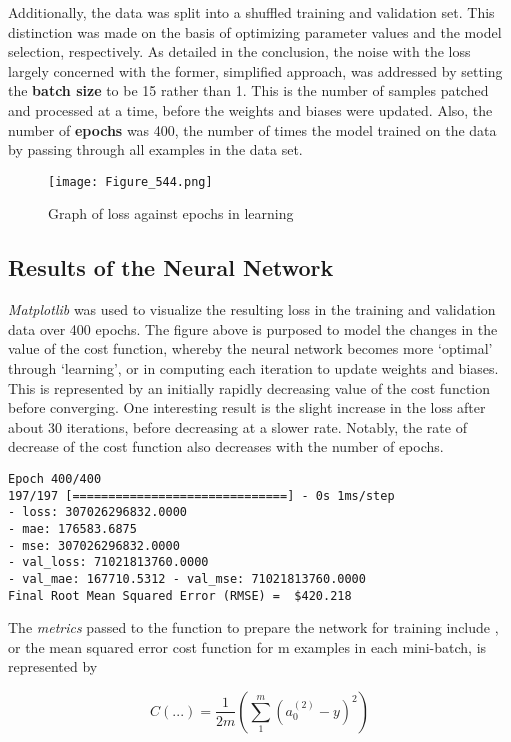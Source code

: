 \documentclass[12pt,a4paper]{article}
\begin{document}
Additionally, the data was split into a shuffled training and validation set. This distinction was made on the basis of optimizing parameter values and the model selection, respectively. As detailed in the conclusion, the noise with the loss largely concerned with the former, simplified approach, was addressed by setting the \textbf{batch size} to be 15 rather than 1. This is the number of samples patched and processed at a time, before the weights and biases were updated. Also, the number of \textbf{epochs} was 400, the number of times the model trained on the data by passing through all examples in the data set. 

\begin{figure}[h]
    \centering
    \texttt{[image: Figure\_544.png]}
    \caption{Graph of loss against epochs in learning}
    \label{fig:my_label}
\end{figure}


\subsection{Results of the Neural Network}

\textit{Matplotlib} was used to visualize the resulting loss in the training and validation data over 400 epochs. The figure above is purposed to model the changes in the value of the cost function, whereby the neural network becomes more ‘optimal’ through ‘learning’, or in computing each iteration to update weights and biases. This is represented by an initially rapidly decreasing value of the cost function before converging. One interesting result is the slight increase in the loss after about 30 iterations, before decreasing at a slower rate. Notably, the rate of decrease of the cost function also decreases with the number of epochs.

\begin{verbatim}
Epoch 400/400
197/197 [==============================] - 0s 1ms/step 
- loss: 307026296832.0000 
- mae: 176583.6875 
- mse: 307026296832.0000 
- val_loss: 71021813760.0000 
- val_mae: 167710.5312 - val_mse: 71021813760.0000
Final Root Mean Squared Error (RMSE) =  $420.218
\end{verbatim}

The \textit{metrics} passed to the  function to prepare the network for training include , or the mean squared error cost function for m examples in each mini-batch, is represented by 

\begin{equation}
    C(...) = \frac{1}{2m} \left(\sum_1^m{\left(a_0^{(2)}-y\right)^2} \right)
\end{equation}
\end{document}
